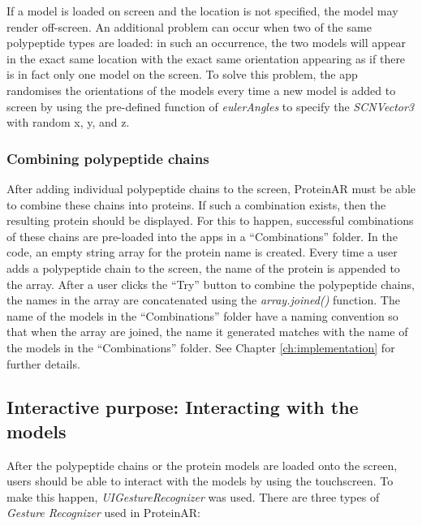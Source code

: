 If a model is loaded on screen and the location is not specified, the model may render off-screen. 
An additional problem can occur when two of the same polypeptide types are loaded: in such an occurrence, the two models will appear in the exact same location with the exact same orientation appearing as if there is in fact only one model on the screen. To solve this problem, the app randomises the orientations of the models every time a new model is added to screen by using the pre-defined function of \emph{eulerAngles} to specify the \emph{SCNVector3} with random x, y, and z.

\subsubsection{Combining polypeptide chains}
After adding individual polypeptide chains to the screen, ProteinAR must be able to combine these chains into proteins. If such a combination exists, then the resulting protein should be displayed. For this to happen, successful combinations of these chains are pre-loaded into the apps in a “Combinations” folder. 
In the code, an empty string array for the protein name is created. Every time a user adds a polypeptide chain to the screen, the name of the protein is appended to the array. After a user clicks the “Try” button to combine the polypeptide chains, the names in the array are concatenated using the \emph{array.joined()} function. The name of the models in the “Combinations” folder have a naming convention so that when the array are joined, the name it generated matches with the name of the models in the “Combinations” folder. See Chapter \ref{ch:implementation} for further details. 

\subsection{Interactive purpose: Interacting with the models}
After the polypeptide chains or the protein models are loaded onto the screen, users should be able to interact with the models by using the touchscreen. To make this happen, \emph{UIGestureRecognizer} was used. There are three types of \emph{Gesture Recognizer} used in ProteinAR:

